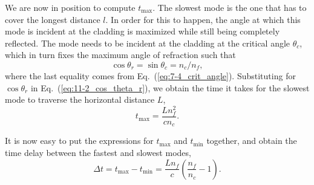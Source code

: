 We are now in position to compute $t_{\max}$.
The slowest mode is the one that has to cover the longest distance $l$.
In order for this to happen, the angle at which this mode is incident at the cladding is maximized while still being completely reflected.
The mode needs to be incident at the cladding at the critical angle $\theta_c$, which in turn fixes the maximum angle of refraction such that
\begin{equation}
    \cos\theta_r = \sin\theta_c = n_c / n_f,
    \label{eq:11-2_cos_theta_r}
\end{equation}
where the last equality comes from Eq.~(\ref{eq:7-4_crit_angle}).
Substituting for $\cos\theta_r$ in Eq.~(\ref{eq:11-2_cos_theta_r}), we obtain the time it takes for the slowest mode to traverse the horizontal distance $L$,
\begin{equation}
    t_{\max }=\frac{L n_f^2}{c n_c}.
\end{equation}

It is now easy to put the expressions for $t_{\mathrm{max}}$ and $t_{\mathrm{min}}$ together, and obtain the time delay between the fastest and slowest modes, 
\begin{equation}
    \Delta t = t_{\max} - t_{\min} = \frac{L n_f}{c}\left(\frac{n_f}{n_c}-1\right).
    \label{eq:11-2_time_delay}
\end{equation}

